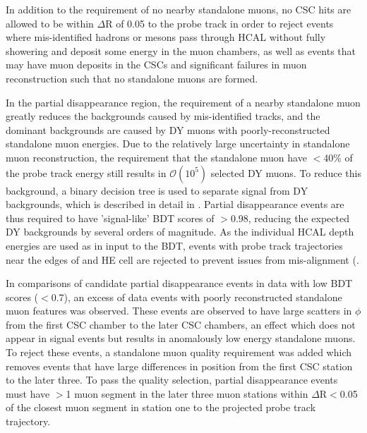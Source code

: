 In addition to the requirement of no nearby standalone muons, no CSC hits are allowed to be within $\Delta$R of 0.05 to the probe track in order to reject events where mis-identified hadrons or mesons pass through HCAL without fully showering and deposit some energy in the muon chambers, as well as events that may have muon deposits in the CSCs and significant failures in muon reconstruction such that no standalone muons are formed.

In the partial disappearance region, the requirement of a nearby standalone muon greatly reduces the backgrounds caused by mis-identified tracks, and the dominant backgrounds are caused by DY muons with poorly-reconstructed standalone muon energies.
Due to the relatively large uncertainty in standalone muon reconstruction, the requirement that the standalone muon have $<$40$\%$ of the probe track energy still results in $\mathcal{O}(10^{5})$ selected DY muons.
To reduce this background, a binary decision tree is used to separate signal from DY backgrounds, which is described in detail in .
Partial disappearance events are thus required to have 'signal-like' BDT scores of $>$0.98, reducing the expected DY backgrounds by several orders of magnitude.
As the individual HCAL depth energies are used as in input to the BDT, events with probe track trajectories near the edges of and HE cell are rejected to prevent issues from mis-alignment (.

In comparisons of candidate partial disappearance events in data with low BDT scores ($<$0.7), an excess of data events with poorly reconstructed standalone muon features was observed.
These events are observed to have large scatters in $\phi$ from the first CSC chamber to the later CSC chambers, an effect which does not appear in signal events but results in anomalously low energy standalone muons.
To reject these events, a standalone muon quality requirement was added which removes events that have large differences in position from the first CSC station to the later three.
To pass the quality selection, partial disappearance events must have $>$1 muon segment in the later three muon stations within $\Delta$R$<$0.05 of the closest muon segment in station one to the projected probe track trajectory.
